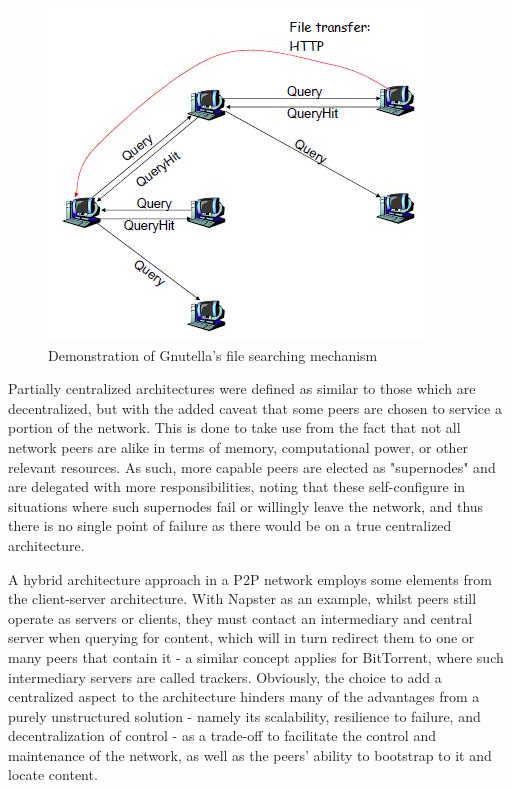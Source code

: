 
\begin{figure}[!h]
\centering
\includegraphics[scale=0.3]{img/gnutella-flood.png}
\caption{Demonstration of Gnutella's file searching mechanism \cite{p2p-survey-1}}
\label{fig:gnutella-flood}
\end{figure}

    Partially centralized architectures were defined as similar to those which are decentralized, but with the added caveat that some peers are chosen to service a portion of the network.
    This is done to take use from the fact that not all network peers are alike in terms of memory, computational power, or other relevant resources.
    As such, more capable peers are elected as "supernodes" and are delegated with more responsibilities, noting that these self-configure in situations where such supernodes fail or willingly leave the network, and thus there is no single point of failure as there would be on a true centralized architecture.

    A hybrid architecture approach in a P2P network employs some elements from the client-server architecture.
    With Napster as an example, whilst peers still operate as servers or clients, they must contact an intermediary and central server when querying for content, which will in turn redirect them to one or many peers that contain it - a similar concept applies for BitTorrent, where such intermediary servers are called trackers.
    Obviously, the choice to add a centralized aspect to the architecture hinders many of the advantages from a purely unstructured solution - namely its scalability, resilience to failure, and decentralization of control - as a trade-off to facilitate the control and maintenance of the network, as well as the peers' ability to bootstrap to it and locate content.

